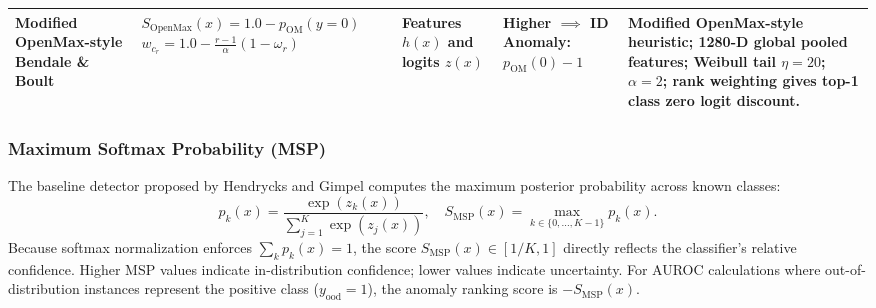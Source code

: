 \begin{table}[!t]
\begin{tabular}{>{\raggedright\arraybackslash}p{1.8cm} >{\raggedright\arraybackslash}p{4.4cm} >{\centering\arraybackslash}p{1.8cm} >{\centering\arraybackslash}p{2.0cm} >{\raggedright\arraybackslash}p{4.2cm}}
\addlinespace[3pt]
\textbf{Modified OpenMax-style} \newline Bendale \& Boult \cite{bendale2016towards} & $S_{\text{OpenMax}}(x) = 1.0 - p_{\text{OM}}(y = 0)$ \newline $w_{c_r} = 1.0 - \frac{r-1}{\alpha}(1 - \omega_r)$ & Features $h(x)$ and logits $z(x)$ & Higher $\implies$ ID \newline Anomaly: $p_{\text{OM}}(0) - 1$ & Modified OpenMax-style heuristic; 1280-D global pooled features; Weibull tail $\eta = 20$; $\alpha = 2$; rank weighting gives top-1 class zero logit discount. \\
\bottomrule
\end{tabular}
\end{table}

\subsubsection{Maximum Softmax Probability (MSP)}
The baseline detector proposed by Hendrycks and Gimpel \cite{hendrycks2017baseline} computes the maximum posterior probability across known classes:
\begin{equation}
p_k(x) = \frac{\exp(z_k(x))}{\sum_{j=1}^K \exp(z_j(x))}, \quad S_{\text{MSP}}(x) = \max_{k \in \{0, \dots, K-1\}} p_k(x).
\end{equation}
Because softmax normalization enforces $\sum_k p_k(x) = 1$, the score $S_{\text{MSP}}(x) \in [1/K, 1]$ directly reflects the classifier's relative confidence. Higher MSP values indicate in-distribution confidence; lower values indicate uncertainty. For AUROC calculations where out-of-distribution instances represent the positive class ($y_{\text{ood}} = 1$), the anomaly ranking score is $-S_{\text{MSP}}(x)$.

